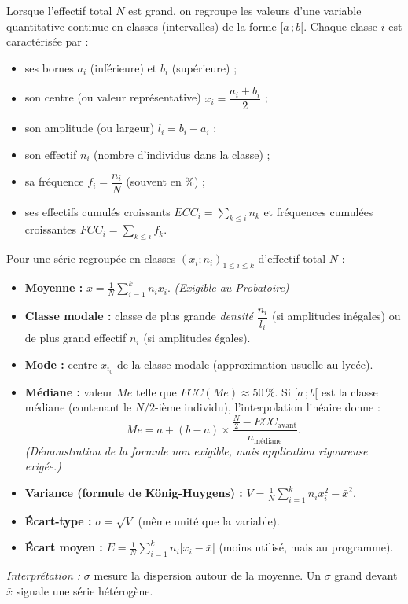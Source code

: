 \documentclass[11pt]{article}
\newcommand{\cle}[1]{{\popxbold\color{popdark}#1}}
\begin{document}
\begin{definition}
Lorsque l'effectif total $N$ est grand, on regroupe les valeurs d'une variable quantitative continue en \cle{classes} (intervalles) de la forme $[a\,;b[$. Chaque classe $i$ est caractérisée par :
\begin{itemize}
\item ses bornes $a_i$ (inférieure) et $b_i$ (supérieure) ;
\item son \cle{centre} (ou valeur représentative) $x_i = \dfrac{a_i+b_i}{2}$ ;
\item son \cle{amplitude} (ou largeur) $l_i = b_i - a_i$ ;
\item son \cle{effectif} $n_i$ (nombre d'individus dans la classe) ;
\item sa \cle{fréquence} $f_i = \dfrac{n_i}{N}$ (souvent en \%) ;
\item ses \cle{effectifs cumulés croissants} $ECC_i = \sum_{k\le i} n_k$ et \cle{fréquences cumulées croissantes} $FCC_i = \sum_{k\le i} f_k$.
\end{itemize}
\end{definition}

\begin{propriete}
Pour une série regroupée en classes $(x_i ; n_i)_{1\le i\le k}$ d'effectif total $N$ :
\begin{itemize}
\item \textbf{Moyenne :} $\displaystyle\bar{x} = \frac{1}{N}\sum_{i=1}^k n_i x_i$. \emph{(Exigible au Probatoire)}
\item \textbf{Classe modale :} classe de plus grande \emph{densité} $\dfrac{n_i}{l_i}$ (si amplitudes inégales) ou de plus grand effectif $n_i$ (si amplitudes égales).
\item \textbf{Mode :} centre $x_{i_0}$ de la classe modale (approximation usuelle au lycée).
\item \textbf{Médiane :} valeur $Me$ telle que $FCC(Me) \approx 50\,\%$. Si $[a\,;b[$ est la classe médiane (contenant le $N/2$-ième individu), l'\cle{interpolation linéaire} donne :
\[ Me = a + (b-a)\times\dfrac{\frac{N}{2} - ECC_{\text{avant}}}{n_{\text{médiane}}}. \]
\emph{(Démonstration de la formule non exigible, mais application rigoureuse exigée.)}
\end{itemize}
\end{propriete}

\begin{propriete}
\begin{itemize}
\item \textbf{Variance (formule de König-Huygens) :} $\displaystyle V = \frac{1}{N}\sum_{i=1}^k n_i x_i^2 - \bar{x}^2$.
\item \textbf{Écart-type :} $\sigma = \sqrt{V}$ (même unité que la variable).
\item \textbf{Écart moyen :} $\displaystyle E = \frac{1}{N}\sum_{i=1}^k n_i |x_i - \bar{x}|$ (moins utilisé, mais au programme).
\end{itemize}
\emph{Interprétation :} $\sigma$ mesure la dispersion autour de la moyenne. Un $\sigma$ grand devant $\bar{x}$ signale une série hétérogène.
\end{propriete}
\end{document}

